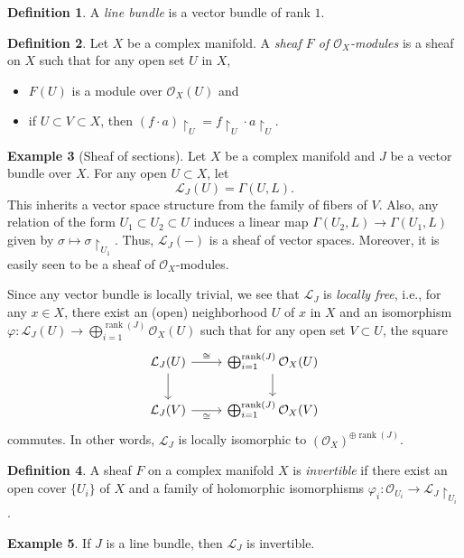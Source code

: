 \documentclass[10pt,letterpaper,cm]{nupset}
\theoremstyle{definition}
\newtheorem{defn}{Definition}[subsection]
\newtheorem{exmp}[defn]{Example}
\theoremstyle{theorem}
\theoremstyle{remark}
\renewcommand{\L}{\mathcal L}
\renewcommand{\O}{\mathcal O}
\newcommand{\1}{\mathbb{1}}
\newcommand{\0}{\vec 0}
\DeclareMathOperator{\rnk}{rank}
\newcommand{\bi}{\begin{itemize}}
\newcommand{\ei}{\end{itemize}}
\begin{document}
\begin{defn}
A \textit{line bundle} is a vector bundle of rank $1$.
\end{defn}

\begin{defn}
Let $X$ be a complex manifold.  A \textit{sheaf $F$ of $\O_X$-modules} is a sheaf on $X$ such that for any open set $U$ in $X$,
\bi
\item $F(U)$ is a module over $\O_X(U)$ and
\item if $U \subset V \subset X$, then $\left(f\cdot a\right)\restriction_U = f\restriction_U\cdot a\restriction_U$.
\ei
\end{defn}

\begin{exmp}[Sheaf of sections]
Let $X$ be a complex manifold and $J$ be a vector bundle over $X$. For any open $U\subset X$, let $$\L_J(U) = \Gamma\left(U, L\right).$$ This inherits a vector space structure from the family of fibers of $V$. Also, any relation of the form $U_1 \subset U_2 \subset U$ induces a linear map $\Gamma\left(U_2, L\right) \to \Gamma\left(U_1, L\right)$ given by $\sigma \mapsto \sigma\restriction_{U_1}$. Thus, $\L_J\left({-}\right)$ is a sheaf of vector spaces. Moreover, it is easily seen to be a sheaf of $\O_X$-modules. 
\end{exmp}

Since any vector bundle is locally trivial, we see that $\L_J$ is \textit{locally free}, i.e., for any $x\in X$, there exist an (open) neighborhood $U$ of $x$ in $X$ and an isomorphism $\varphi : \L_J(U) \to \bigoplus_{i=1}^{\rnk(J)}\O_X(U)$ such that for any open set $V\subset U$, the square
\[
\begin{tikzcd}
\L_J(U) \arrow[r, "\cong"] \arrow[d] &  \bigoplus_{i=1}^{\rnk(J)}{\O_X(U)} \arrow[d] \\
\L_J(V) \arrow[r, "\cong"']          &  \bigoplus_{i=1}^{\rnk(J)}{\O_X(V)}          
\end{tikzcd}
\]
commutes. In other words, $\L_J$ is locally isomorphic to $\left(\O_X\right)^{\oplus{\rnk(J)}}$.

\begin{defn} 
A sheaf $F$ on a complex manifold $X$ is \textit{invertible} if there exist an open cover $\{U_i\}$ of $X$ and a family of holomorphic isomorphisms $\varphi_i : \O_{U_i} \to \L_J\restriction_{U_i}$.
\end{defn}

\begin{exmp} 
If $J$ is a line bundle, then $\L_J$ is invertible.
\end{exmp}
\end{document}
